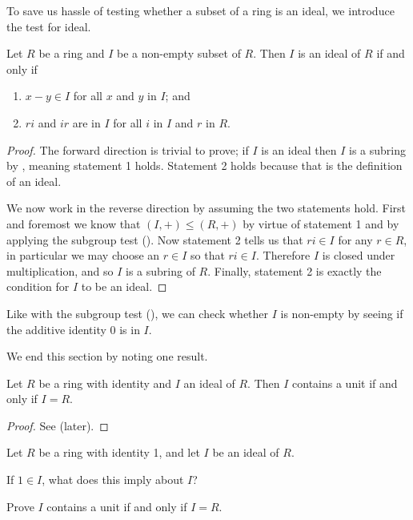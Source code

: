 To save us hassle of testing whether a subset of a ring is an ideal, we introduce the test for ideal.
\begin{theorem}\label{thrm-test-for-ideal}
    Let $R$ be a ring and $I$ be a non-empty subset of $R$. Then $I$ is an ideal of $R$ if and only if
    \begin{enumerate}
        \item $x - y \in I$ for all $x$ and $y$ in $I$; and
        \item $ri$ and $ir$ are in $I$ for all $i$ in $I$ and $r$ in $R$.
    \end{enumerate}
\end{theorem}
\begin{proof}
    The forward direction is trivial to prove; if $I$ is an ideal then $I$ is a subring by , meaning statement 1 holds. Statement 2 holds because that is the definition of an ideal.

    We now work in the reverse direction by assuming the two statements hold. First and foremost we know that $(I,+) \leq (R,+)$ by virtue of statement 1 and by applying the subgroup test (). Now statement 2 tells us that $ri \in I$ for any $r \in R$, in particular we may choose an $r \in I$ so that $ri \in I$. Therefore $I$ is closed under multiplication, and so $I$ is a subring of $R$. Finally, statement 2 is exactly the condition for $I$ to be an ideal.
\end{proof}
\begin{remark}
    Like with the subgroup test (), we can check whether $I$ is non-empty by seeing if the additive identity 0 is in $I$.
\end{remark}

We end this section by noting one result.
\begin{proposition}\label{prop-ideal-contains-unit-iff-ideal-is-whole-ring}
    Let $R$ be a ring with identity and $I$ an ideal of $R$. Then $I$ contains a unit if and only if $I = R$.
\end{proposition}
\begin{proof}
    See  (later).
\end{proof}

\begin{exercise}\label{exercise-ideal-contains-unit-iff-ideal-is-whole-ring}
    Let $R$ be a ring with identity 1, and let $I$ be an ideal of $R$.
    \begin{partquestions}{\roman*}
        \item If $1 \in I$, what does this imply about $I$?
        \item Prove $I$ contains a unit if and only if $I = R$.
    \end{partquestions}
\end{exercise}

